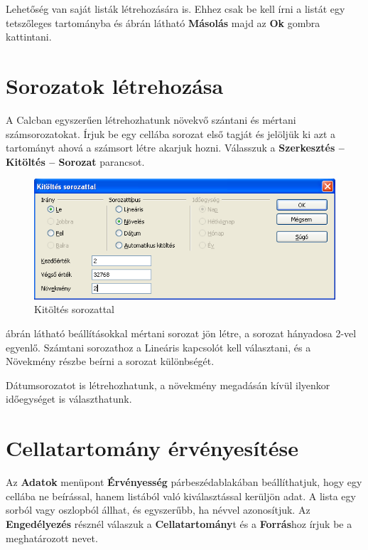 Lehetőség van saját listák létrehozására is. Ehhez csak
be kell írni a listát egy tetszőleges tartományba és 
ábrán látható \textbf{Másolás} majd az \textbf{Ok} gombra
kattintani. 


\section{Sorozatok létrehozása}

A Calcban egyszerűen létrehozhatunk növekvő szántani és
mértani számsorozatokat. Írjuk be egy cellába sorozat első
tagját és jelöljük ki azt a tartományt ahová a számsort
létre akarjuk hozni. Válasszuk a \textbf{Szerkesztés --
Kitöltés --  Sorozat} parancsot. 

\begin{figure}[!h]
\begin{center}
\includegraphics[width=12.081cm]{oocalcv1-img109.png}
\caption{Kitöltés sorozattal}\label{KitöltésSorozattal}
\end{center}
\end{figure}

 ábrán látható beállításokkal mértani sorozat
jön létre, a sorozat hányadosa 2-vel egyenlő. Számtani
sorozathoz a Lineáris kapcsolót kell választani, és a
Növekmény részbe beírni a sorozat különbségét.

Dátumsorozatot is létrehozhatunk, a növekmény megadásán
kívül ilyenkor időegységet is választhatunk.


\section{Cellatartomány érvényesítése}

Az \textbf{Adatok} menüpont \textbf{Érvényesség}
párbeszédablakában beállíthatjuk, hogy egy cellába ne
beírással, hanem listából való kiválasztással
kerüljön adat. A lista egy sorból vagy oszlopból állhat, és
egyszerűbb, ha névvel azonosítjuk. Az \textbf{Engedélyezés}
résznél válaszuk a \textbf{Cellatartomány}t és a
\textbf{Forrás}hoz írjuk be a meghatározott nevet.


